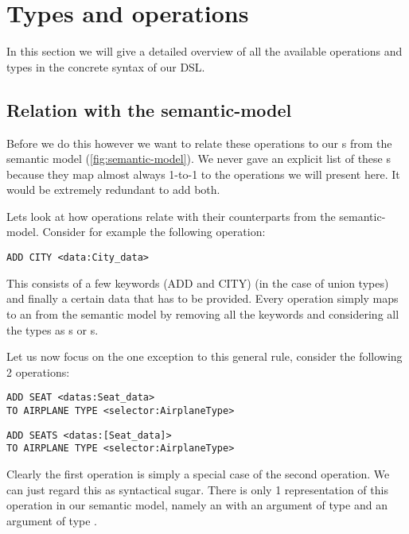 \section{Types and operations}
\label{sec:operations}

In this section we will give a detailed overview of all the available
operations and types in the concrete syntax of our DSL.
 
\subsection{Relation with the semantic-model}

Before we do this however we want to relate these operations to our
s from the semantic model (\ref{fig:semantic-model}). We never
gave an explicit list of these s because they map almost
always 1-to-1 to the operations we will present here. It would be extremely
redundant to add both.

Lets look at how operations relate with their counterparts from the
semantic-model. Consider for example the following operation:

\begin{operation}
  \lstinline{ADD CITY <data:City_data>}
  \label{op:add_city}
\end{operation}

This consists of a few keywords (ADD and CITY) (in the case of union types) and
finally a certain data that has to be provided. Every operation simply maps to
an  from the semantic model by removing all the keywords and
considering all the types as s or s.

Let us now focus on the one exception to this general rule, consider the
following 2 operations:
\begin{operation}
  \begin{lstlisting}
ADD SEAT <datas:Seat_data>
TO AIRPLANE TYPE <selector:AirplaneType>
  \end{lstlisting}
  \label{op:add_seats}
\end{operation}
\begin{operation}
  \begin{lstlisting}
ADD SEATS <datas:[Seat_data]>
TO AIRPLANE TYPE <selector:AirplaneType>
  \end{lstlisting}
  \label{op:add_seats}
\end{operation}
Clearly the first operation is simply a special case of the second operation.
We can just regard this as syntactical sugar. There is only 1 representation of
this operation in our semantic model, namely an 
 with an argument of type  and an
argument of type .


